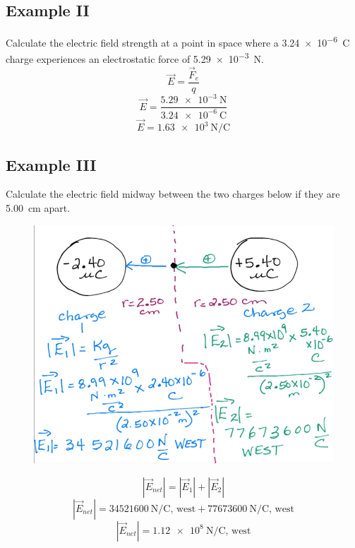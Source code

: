 \documentclass[a4paper,12pt]{article}
\begin{document}
\subsection{Example II}
Calculate the electric field strength at a point in space where a \SI{3.24e-6}{\coulomb} charge experiences an electrostatic force of \SI{5.29e-3}{\newton}.
$$\vec{E} = \frac{\vec{F}_e}{q}$$
$$\vec{E} = \frac{\SI{5.29e-3}{\newton}}{\SI{3.24e-6}{\coulomb}}$$
$$\vec{E} = \SI{1.63e3}{\newton\per\coulomb}$$

\pagebreak
\subsection{Example III}
Calculate the electric field midway between the two charges below if they are \SI{5.00}{\cm} apart.
\begin{figure}[H]
    \centering
    \includegraphics[width=\textwidth]{fieldquestion3}
\end{figure}

$$|\vec{E}_{net}| = |\vec{E}_1| + |\vec{E}_2|$$
$$|\vec{E}_{net}| = \SI{34521600}{\newton\per\coulomb}\textrm{, west} + \SI{77673600}{\newton\per\coulomb}\textrm{, west}$$
$$|\vec{E}_{net}| = \SI{1.12e8}{\newton\per\coulomb}\textrm{, west}$$

\pagebreak
\end{document}
